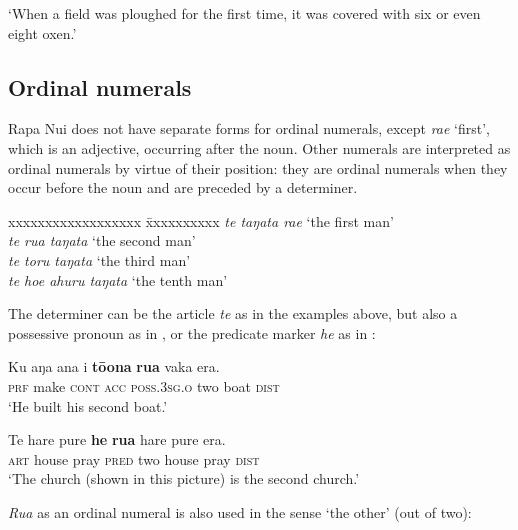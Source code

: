 \glt 
‘When a field was ploughed for the first time, it was covered with six or even eight oxen.’ \textstyleExampleref{[R539-1.110]}
\z

\subsection{Ordinal numerals}\label{sec:4.3.3}

Rapa Nui does not have separate forms for ordinal numerals, except \textit{ra{\ꞌ}e} ‘first’, which is an adjective, occurring after the noun. Other numerals are interpreted as ordinal numerals by virtue of their position: they are ordinal numerals when they occur before the noun and are preceded by a determiner. 

\ea
\begin{tabbing}
 xxxxxxxxxxxxxxxxxx \= xxxxxxxxxx\kill
\textit{te taŋata ra{\ꞌ}e} \> ‘the first man’\\
\textit{te rua taŋata} \> ‘the second man’\\
\textit{te toru taŋata} \> ‘the third man’\\
\textit{te ho{\ꞌ}e {\ꞌ}ahuru taŋata} \> ‘the tenth man’
\end{tabbing}
\z 
The determiner can be the article \textit{te} as in the examples above, but also a possessive pronoun as in , or the predicate marker \textit{he} as in :

\ea\label{ex:4.39}
\gll Ku aŋa {\ꞌ}ana i \textbf{tō{\ꞌ}ona} \textbf{rua} vaka era. \\
\textsc{prf} make \textsc{cont} \textsc{acc} \textsc{poss.3sg.o} two boat \textsc{dist} \\

\glt 
‘He built his second boat.’ \textstyleExampleref{[R539-1.168]}
\z

\ea\label{ex:4.40}
\gll Te hare pure \textbf{he} \textbf{rua} hare pure era. \\
\textsc{art} house pray \textsc{pred} two house pray \textsc{dist} \\

\glt
‘The church (shown in this picture) is the second church.’ \textstyleExampleref{[R412.203]} 
\z

\textit{Rua} as an ordinal numeral is also used in the sense ‘the other’ (out of two):

